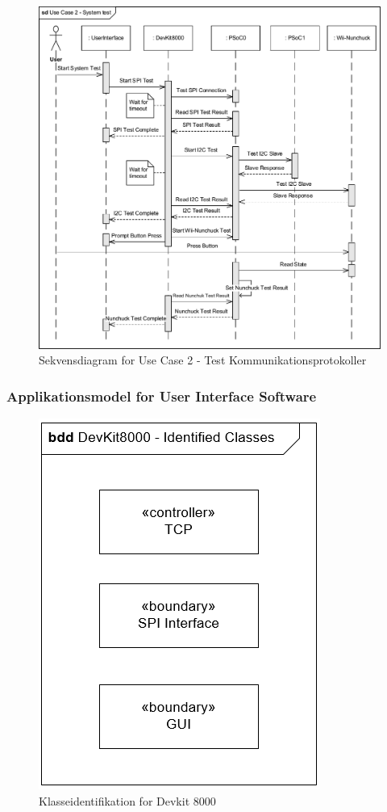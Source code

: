 \begin{figure}[H]
	\centering
	\includegraphics[width=\textwidth]{Systemarkitektur/images/SequenceDiagramUC2}
	\caption{Sekvensdiagram for Use Case 2 - Test Kommunikationsprotokoller}
	\label{fig:SystemTestOverviewSequenceDiagram}
\end{figure}

\subsubsection{Applikationsmodel for User Interface Software}

\begin{figure}[H]
	\centering
	\includegraphics[scale=0.8]{Systemarkitektur/images/KlasseIdentifikationDevKit.png}
	\caption{Klasseidentifikation for Devkit 8000}
	\label{fig:klasseidentifikationDevKit}
\end{figure}

